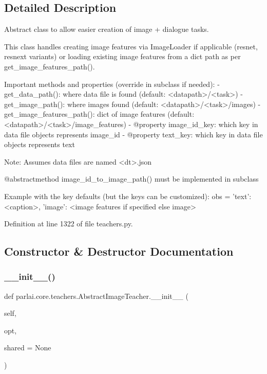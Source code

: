 \subsection{Detailed Description}
\begin{DoxyVerb}Abstract class to allow easier creation of image + dialogue tasks.

This class handles creating image features via ImageLoader if applicable
(resnet, resnext variants) or loading existing image features from a dict
path as per get_image_features_path().

Important methods and properties (override in subclass if needed):
- get_data_path(): where data file is found (default: <datapath>/<task>)
- get_image_path(): where images found (default: <datapath>/<task>/images)
- get_image_features_path(): dict of image features (default:
  <datapath>/<task>/image_features)
- @property image_id_key: which key in data file objects represents image_id
- @property text_key: which key in data file objects represents text

Note: Assumes data files are named <dt>.json

@abstractmethod image_id_to_image_path() must be implemented in subclass

Example with the key defaults (but the keys can be customized):
obs = {
    'text': <caption>,
    'image': <image features if specified else image>
}
\end{DoxyVerb}
 

Definition at line 1322 of file teachers.\+py.



\subsection{Constructor \& Destructor Documentation}
\mbox{\label{classparlai_1_1core_1_1teachers_1_1AbstractImageTeacher_aab36cededc1817fee5109293bd62c51d}} 
\subsubsection{\texorpdfstring{\+\_\+\+\_\+init\+\_\+\+\_\+()}{\_\_init\_\_()}}
{\footnotesize\ttfamily def parlai.\+core.\+teachers.\+Abstract\+Image\+Teacher.\+\_\+\+\_\+init\+\_\+\+\_\+ (\begin{DoxyParamCaption}\item[{}]{self,  }\item[{}]{opt,  }\item[{}]{shared = {\ttfamily None} }\end{DoxyParamCaption})}



